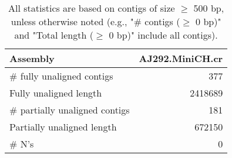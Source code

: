 \documentclass[12pt,a4paper]{article}
\begin{document}
\begin{table}[ht]
\begin{center}
\caption{All statistics are based on contigs of size $\geq$ 500 bp, unless otherwise noted (e.g., "\# contigs ($\geq$ 0 bp)" and "Total length ($\geq$ 0 bp)" include all contigs).}
\begin{tabular}{|l*{1}{|r}|}
\hline
Assembly & AJ292.MiniCH.cr \\ \hline
\# fully unaligned contigs & 377 \\ \hline
Fully unaligned length & 2418689 \\ \hline
\# partially unaligned contigs & 181 \\ \hline
Partially unaligned length & 672150 \\ \hline
\# N's & 0 \\ \hline
\end{tabular}
\end{center}
\end{table}
\end{document}
